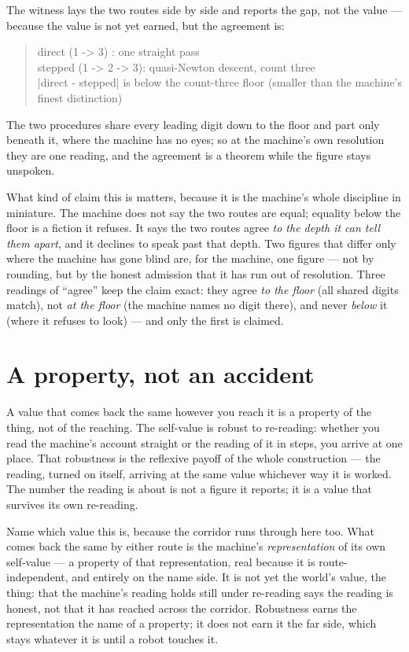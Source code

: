 The witness lays the two routes side by side and reports the gap, not the value --- because the value is not yet earned,
but the agreement is:
\begin{quote}\ttfamily
direct   (1 -> 3)     : one straight pass\\
stepped  (1 -> 2 -> 3): quasi-Newton descent, count three\\
|direct - stepped|  is below the count-three floor  (smaller than the machine's finest distinction)
\end{quote}
The two procedures share every leading digit down to the floor and part only beneath it, where the machine has no eyes;
so at the machine's own resolution they are one reading, and the agreement is a theorem while the figure stays unspoken.

What kind of claim this is matters, because it is the machine's whole discipline in miniature.
The machine does not say the two routes are equal; equality below the floor is a fiction it refuses.
It says the two routes agree \emph{to the depth it can tell them apart}, and it declines to speak past that depth.
Two figures that differ only where the machine has gone blind are, for the machine, one figure --- not by rounding, but
by the honest admission that it has run out of resolution.
Three readings of ``agree'' keep the claim exact: they agree \emph{to the floor} (all shared digits match), not
\emph{at the floor} (the machine names no digit there), and never \emph{below} it (where it refuses to look) --- and only
the first is claimed.

\section{A property, not an accident}

A value that comes back the same however you reach it is a property of the thing, not of the reaching.
The self-value is robust to re-reading: whether you read the machine's account straight or the reading of it in steps, you
arrive at one place.
That robustness is the reflexive payoff of the whole construction --- the reading, turned on itself, arriving at the same
value whichever way it is worked.
The number the reading is about is not a figure it reports; it is a value that survives its own re-reading.

Name which value this is, because the corridor runs through here too.
What comes back the same by either route is the machine's \emph{representation} of its own self-value --- a property of
that representation, real because it is route-independent, and entirely on the name side.
It is not yet the world's value, the thing: that the machine's reading holds still under re-reading says the reading is
honest, not that it has reached across the corridor.
Robustness earns the representation the name of a property; it does not earn it the far side, which stays whatever it is
until a robot touches it.

